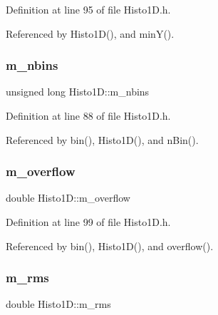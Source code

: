 Definition at line 95 of file Histo1\+D.\+h.



Referenced by Histo1\+D(), and min\+Y().

\mbox{\label{classHisto1D_a1913aca9a278b4bfd365f35b85e65d8d}} 
\subsubsection{\texorpdfstring{m\+\_\+nbins}{m\_nbins}}
{\footnotesize\ttfamily unsigned long Histo1\+D\+::m\+\_\+nbins\hspace{0.3cm}{\ttfamily [private]}}



Definition at line 88 of file Histo1\+D.\+h.



Referenced by bin(), Histo1\+D(), and n\+Bin().

\mbox{\label{classHisto1D_ab60b2ec4e435a3094b7ec218404aa16f}} 
\subsubsection{\texorpdfstring{m\+\_\+overflow}{m\_overflow}}
{\footnotesize\ttfamily double Histo1\+D\+::m\+\_\+overflow\hspace{0.3cm}{\ttfamily [private]}}



Definition at line 99 of file Histo1\+D.\+h.



Referenced by bin(), Histo1\+D(), and overflow().

\mbox{\label{classHisto1D_a1331c670df40eb18d8a814f5a15ec7da}} 
\subsubsection{\texorpdfstring{m\+\_\+rms}{m\_rms}}
{\footnotesize\ttfamily double Histo1\+D\+::m\+\_\+rms\hspace{0.3cm}{\ttfamily [private]}}



